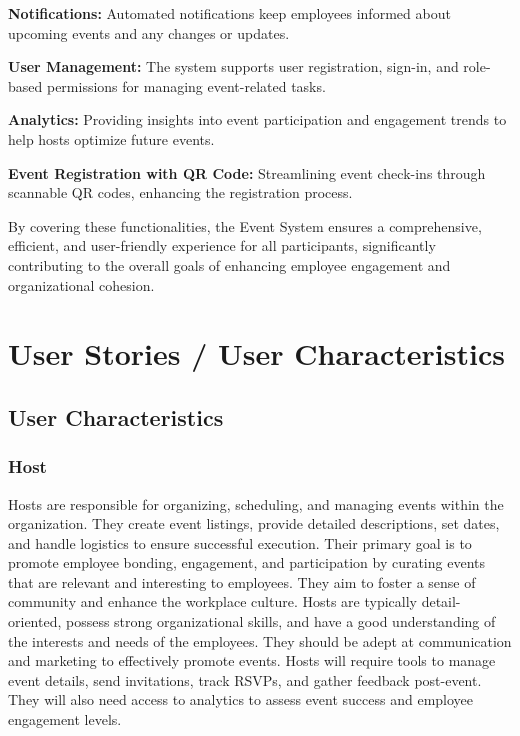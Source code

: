\documentclass[a4paper,12pt]{article}
\begin{document}
\textbf{Notifications:} Automated notifications keep employees informed about upcoming events 
and any changes or updates.

\textbf{User Management:} The system supports user registration, sign-in, and role-based 
permissions for managing event-related tasks.

\textbf{Analytics:} Providing insights into event participation and engagement trends to 
help hosts optimize future events.

\textbf{Event Registration with QR Code:} Streamlining event check-ins through scannable 
QR codes, enhancing the registration process.

By covering these functionalities, the Event System ensures a comprehensive, efficient, 
and user-friendly experience for all participants, significantly contributing to the overall 
goals of enhancing employee engagement and organizational cohesion.

\section{User Stories / User Characteristics}
\label{sec:user-stories}

\subsection{User Characteristics}

\subsubsection{Host}
Hosts are responsible for organizing, scheduling, and managing events within the organization. 
They create event listings, provide detailed descriptions, set dates, and handle logistics to 
ensure successful execution. Their primary goal is to promote employee bonding, engagement, and 
participation by curating events that are relevant and interesting to employees. They aim to foster 
a sense of community and enhance the workplace culture. Hosts are typically detail-oriented, possess 
strong organizational skills, and have a good understanding of the interests and needs of the employees. 
They should be adept at communication and marketing to effectively promote events. Hosts will require 
tools to manage event details, send invitations, track RSVPs, and gather feedback post-event. They 
will also need access to analytics to assess event success and employee engagement levels. 
\end{document}
